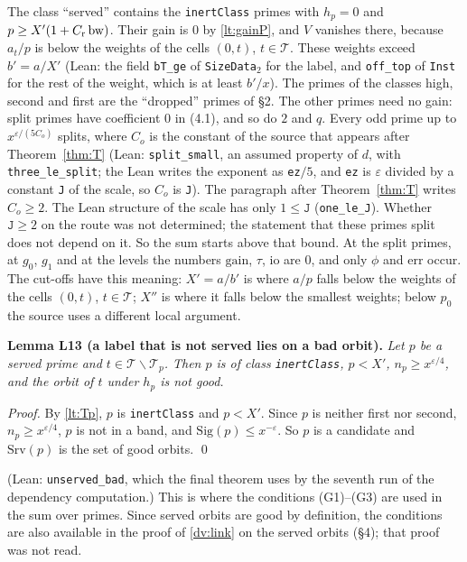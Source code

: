 \documentclass[11pt,letterpaper]{article}
\begin{document}
The class ``served'' contains the \texttt{inertClass} primes with $h_p=0$ and $p\ge X'(1+C_{\rm r}\,\mathrm{bw})$.
Their gain is $0$ by \eqref{lt:gainP}, and $V$ vanishes there, because $a_t/p$ is below the weights of the
cells $(0,t)$, $t\in\mathcal T$. These weights exceed $b'=a/X'$ (Lean: the field \texttt{bT\_ge} of
\texttt{SizeData}$_2$ for the label, and \texttt{off\_top} of \texttt{Inst} for the rest of the weight,
which is at least $b'/x$). The primes of the classes high, second and first are the ``dropped'' primes of \S2. The
other primes need no gain: split primes have coefficient $0$ in (4.1), and so do $2$ and $q$. Every odd
prime up to $x^{\varepsilon/(5C_o)}$ splits, where $C_o$ is the constant of the source that appears
after Theorem~\ref{thm:T} (Lean: \texttt{split\_small}, an assumed property of $d$, with
\texttt{three\_le\_split}; the Lean writes the exponent as \texttt{ez}$/5$, and \texttt{ez} is
$\varepsilon$ divided by a constant \texttt{J} of the scale, so $C_o$ is \texttt{J}). The paragraph after
Theorem~\ref{thm:T} writes $C_o\ge2$. The Lean structure of the scale has only $1\le\mathtt J$
(\texttt{one\_le\_J}). Whether $\mathtt J\ge2$ on the route was not determined; the statement that these
primes split does not depend on it. So the sum starts above that bound. At the
split primes, at $g_0$, $g_1$ and at the levels the numbers $\mathrm{gain}$, $\tau$, $\mathrm{io}$ are
$0$, and only $\phi$ and $\mathrm{err}$ occur. The cut-offs have this meaning: $X'=a/b'$ is where $a/p$
falls below the weights of the cells $(0,t)$, $t\in\mathcal T$; $X''$ is where it falls below the smallest
weights; below $p_0$ the source uses a different local argument.

\textbf{Lemma L13 (a label that is not served lies on a bad orbit).} \emph{Let $p$ be a served prime and
$t\in\mathcal T\smallsetminus\mathcal T_p$. Then $p$ is of class \texttt{inertClass}, $p<X'$,
$n_p\ge x^{\varepsilon/4}$, and the orbit of $t$ under $h_p$ is not good.}

\emph{Proof.} By \eqref{lt:Tp}, $p$ is \texttt{inertClass} and $p<X'$. Since $p$ is neither first nor
second, $n_p\ge x^{\varepsilon/4}$, $p$ is not in a band, and $\mathrm{Sig}(p)\le x^{-\varepsilon}$. So
$p$ is a candidate and $\mathrm{Srv}(p)$ is the set of good orbits. \qed

\noindent (Lean: \texttt{unserved\_bad}, which the final theorem uses by the seventh run of the
dependency computation.) This is where the conditions (G1)--(G3) are used in the sum over
primes. Since served orbits are good by definition, the conditions are also available in the proof of
\eqref{dv:link} on the served orbits (\S4); that proof was not read.
\end{document}
